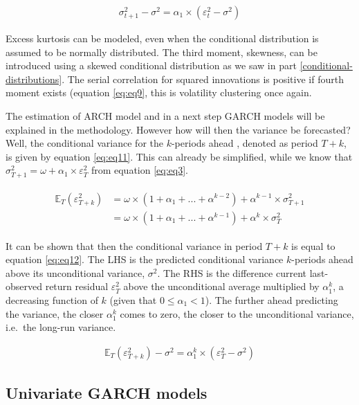 \documentclass[a4paper, twoside]{templates/ociamthesis}
\begin{document}
\begin{align} 
\sigma_{t+1}^2 - \sigma^2 = \alpha_1\times(\varepsilon_t^2 - \sigma^2)
 \label{eq:eq10}
\end{align}

\noindent Excess kurtosis can be modeled, even when the conditional distribution is assumed to be normally distributed. The third moment, skewness, can be introduced using a skewed conditional distribution as we saw in part \ref{conditional-distributions}. The serial correlation for squared innovations is positive if fourth moment exists (equation \eqref{eq:eq9}, this is volatility clustering once again.

\noindent The estimation of ARCH model and in a next step GARCH models will be explained in the methodology. However how will then the variance be forecasted? Well, the conditional variance for the \(k\)-periods ahead , denoted as period \(T+k\), is given by equation \eqref{eq:eq11}. This can already be simplified, while we know that \(\sigma_{T+1}^2 = \omega + \alpha_1 \times \varepsilon_T^2\) from equation \eqref{eq:eq3}.

\begin{align} 
\begin{split}
\mathbb{E}_T(\varepsilon_{T+k}^2) 
&= \omega\times(1+\alpha_1 + ... + \alpha^{k-2}) + \alpha^{k-1}\times\sigma_{T+1}^2 \\
&= \omega\times(1+\alpha_1 + ... + \alpha^{k-1}) + \alpha^{k}\times\sigma_{T}^2
\end{split}
 \label{eq:eq11}
\end{align}

\noindent It can be shown that then the conditional variance in period \(T+k\) is equal to equation \eqref{eq:eq12}. The LHS is the predicted conditional variance \(k\)-periods ahead above its unconditional variance, \(\sigma^2\). The RHS is the difference current last-observed return residual \(\varepsilon_T^2\) above the unconditional average multiplied by \(\alpha_1^k\), a decreasing function of \(k\) (given that \(0 \le\alpha_1 <1\)). The further ahead predicting the variance, the closer \(\alpha_1^k\) comes to zero, the closer to the unconditional variance, i.e.~the long-run variance.

\begin{align} 
\mathbb{E}_T(\varepsilon_{T+k}^2) - \sigma^2 = \alpha_1^k\times(\varepsilon_T^2 - \sigma^2)
 \label{eq:eq12}
\end{align}

\hypertarget{univ-garch}{%
\subsection{Univariate GARCH models}\label{univ-garch}}
\end{document}

